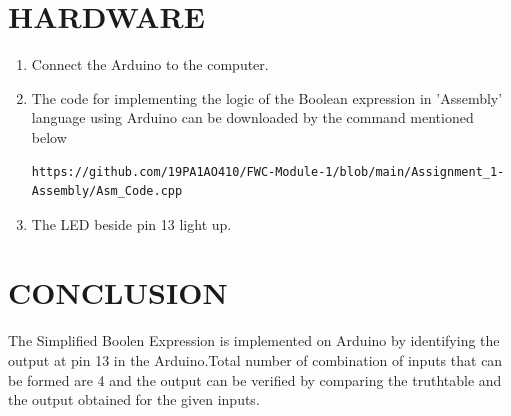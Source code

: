 \documentclass[10pt, a4paper]{article}
\begin{document}
\section{HARDWARE}
\begin{enumerate}
\item Connect the Arduino to the computer.
\item The code for implementing the logic of the Boolean expression in 'Assembly' language using Arduino can be downloaded by the command mentioned below\\
\begin{lstlisting}
https://github.com/19PA1AO410/FWC-Module-1/blob/main/Assignment_1-Assembly/Asm_Code.cpp
\end{lstlisting}
\item The LED beside pin 13 light up.
\end{enumerate}
\section{CONCLUSION}
The Simplified Boolen Expression is implemented on Arduino by identifying the output at pin 13 in the Arduino.Total number of combination of inputs that can be formed are 4 and the output can be verified by comparing the truthtable and the output obtained for the given inputs.


\end{document}
